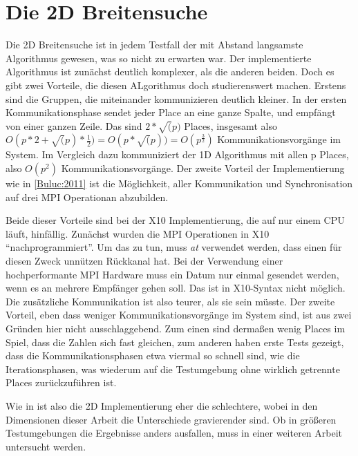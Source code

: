 \section{Die 2D Breitensuche} %
\label{sec:die_2d_breitensuche}
Die 2D Breitensuche ist in jedem Testfall der mit Abstand langsamste Algorithmus gewesen, was so nicht zu erwarten war. Der implementierte Algorithmus ist zunächst deutlich komplexer, als die anderen beiden. Doch es gibt zwei Vorteile, die diesen ALgorithmus doch studierenswert machen. Erstens sind die Gruppen, die miteinander kommunizieren deutlich kleiner. In der ersten Kommunikationsphase sendet jeder Place an eine ganze Spalte, und empfängt von einer ganzen Zeile. Das sind $2 * \sqrt(p)$ Places, insgesamt also $O(p * 2 + \sqrt(p) * \frac{1}{2}) = O(p * \sqrt(p))= O(p^{\frac{3}{2}})$ Kommunikationsvorgänge im System. Im Vergleich dazu kommuniziert der 1D Algorithmus mit allen p Places, also $O(p^2)$ Kommunikationsvorgänge. Der zweite Vorteil der Implementierung wie in \ref{Buluc:2011} ist die Möglichkeit, aller Kommunikation und Synchronisation auf drei MPI Operationan abzubilden.

Beide dieser Vorteile sind bei der X10 Implementierung, die auf nur einem CPU läuft, hinfällig. Zunächst wurden die MPI Operationen in X10 \enquote{nachprogrammiert}. Um das zu tun, muss \textit{at} verwendet werden, dass einen für diesen Zweck unnützen Rückkanal hat. Bei der Verwendung einer hochperformante MPI Hardware muss ein Datum nur einmal gesendet werden, wenn es an mehrere Empfänger gehen soll. Das ist in X10-Syntax nicht möglich. Die zusätzliche Kommunikation ist also teurer, als sie sein müsste. 
Der zweite Vorteil, eben dass weniger Kommunikationsvorgänge im System sind, ist aus zwei Gründen hier nicht ausschlaggebend. Zum einen sind dermaßen wenig Places im Spiel, dass die Zahlen sich fast gleichen, zum anderen haben erste Tests gezeigt, dass die Kommunikationsphasen etwa viermal so schnell sind, wie die Iterationsphasen, was wiederum auf die Testumgebung ohne wirklich getrennte Places zurückzuführen ist.

Wie in \cite{Buluc:2011} ist also die 2D Implementierung eher die schlechtere, wobei in den Dimensionen dieser Arbeit die Unterschiede gravierender sind. Ob in  größeren Testumgebungen die Ergebnisse anders ausfallen, muss in einer weiteren Arbeit untersucht werden.
